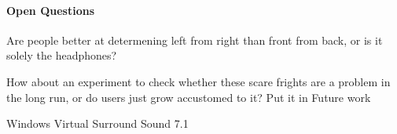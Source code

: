 \paragraph{Open Questions}


Are people better at determening left from right than front from back, or is it solely the headphones?

How about an experiment to check whether these scare frights are a problem in the long run, or do users just grow accustomed to it?
	Put it in Future work
	
Windows Virtual Surround Sound 7.1
